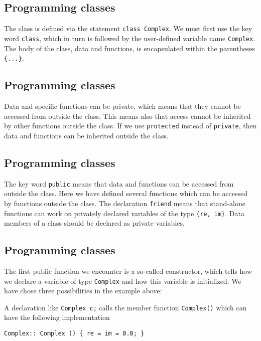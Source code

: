 \documentclass[%
oneside,                 %
final,                   %
10pt]{article}
\begin{document}
\subsection*{Programming classes}

The class is defined via the statement \Verb!class Complex!. We must first use the key word
\Verb!class!, which in turn is followed by the user-defined variable name  \Verb!Complex!.
The body of the class, data and functions, is encapsulated  within the parentheses \Verb!{...}!.

\subsection*{Programming classes}

Data and specific functions can be private, which means that they cannot be accessed from outside the class.
This means also that access cannot be inherited by other functions outside the class. If we use \Verb!protected!
instead of \Verb!private!, then data and functions can be inherited outside the class.

\subsection*{Programming classes}

The key word \Verb!public! means  that data and functions can be accessed from outside the class.
Here we have defined several functions  which can be accessed by functions outside the class.
The declaration \Verb!friend! means that stand-alone functions can work on privately declared  variables  of the type
\Verb!(re, im)!.  Data members of a class should be declared as private variables.

\subsection*{Programming classes}

The first public function we encounter is a so-called
constructor, which  tells how we declare a variable of type \Verb!Complex!
and how this variable is initialized. We have chose  three possibilities in the example above:

A declaration like \Verb!Complex c;! calls the member function \Verb!Complex()! which can have the following implementation

\begin{verbatim}
Complex:: Complex () { re = im = 0.0; }
\end{verbatim}
\end{document}
